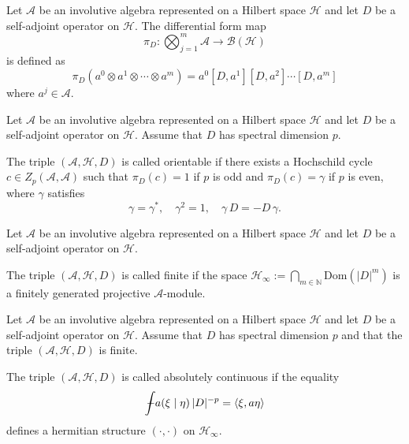 \begin{definition}\label{def:differential-form-map}
    Let $\mathcal{A}$ be an involutive algebra represented on a Hilbert space $\mathcal{H}$ and let $D$ be a self-adjoint operator on $\mathcal{H}$. The differential form map
    \[
    \pi_D: \bigotimes_{j=1}^m \mathcal{A} \to \mathcal{B}(\mathcal{H})
    \] 
    is defined as
    \[
    \pi_D(a^0 \otimes a^1 \otimes \cdots \otimes a^m) =  a^0 [D,a^1] [D,a^2] \cdots [D,a^m]
    \]
    where $a^j \in \mathcal{A}$.
\end{definition}

\begin{definition}\label{def:spectral-orientability}
    Let $\mathcal{A}$ be an involutive algebra represented on a Hilbert space $\mathcal{H}$ and let $D$ be a self-adjoint operator on $\mathcal{H}$. Assume that $D$ has spectral dimension $p$.  

    The triple $(\mathcal{A}, \mathcal{H}, D)$ is called orientable if there exists a Hochschild cycle $c \in Z_p(\mathcal{A},\mathcal{A})$ such that $\pi_D(c)=1$ if $p$ is odd and $\pi_D(c) = \gamma$ if $p$ is even, where $\gamma$ satisfies 
    \[
    \gamma = \gamma^*, \quad \gamma^2 = 1, \quad \gamma \, D = -D \, \gamma.
    \]
\end{definition}

\begin{definition}\label{def:spectral-finiteness}
    Let $\mathcal{A}$ be an involutive algebra represented on a Hilbert space $\mathcal{H}$ and let $D$ be a self-adjoint operator on $\mathcal{H}$. 

    The triple $(\mathcal{A}, \mathcal{H}, D)$ is called finite if the space $\mathcal{H}_\infty := \bigcap_{m \in \mathbb{N}} \textrm{Dom}(|D|^m)$ is a finitely generated projective $\mathcal{A}$-module.
\end{definition}

\begin{definition}\label{def:spectral-absolute-continuity}
    Let $\mathcal{A}$ be an involutive algebra represented on a Hilbert space $\mathcal{H}$ and let $D$ be a self-adjoint operator on $\mathcal{H}$. Assume that $D$ has spectral dimension $p$ and that the triple $(\mathcal{A}, \mathcal{H}, D)$ is finite.

    The triple $(\mathcal{A}, \mathcal{H}, D)$ is called absolutely continuous if the equality
    \[
    \ncint \, a(\xi\mid\eta)\,|D|^{-p} = \langle \xi, a \eta \rangle
    \]
    defines a hermitian structure $(\cdot, \cdot)$ on $\mathcal{H}_\infty$.
\end{definition}

